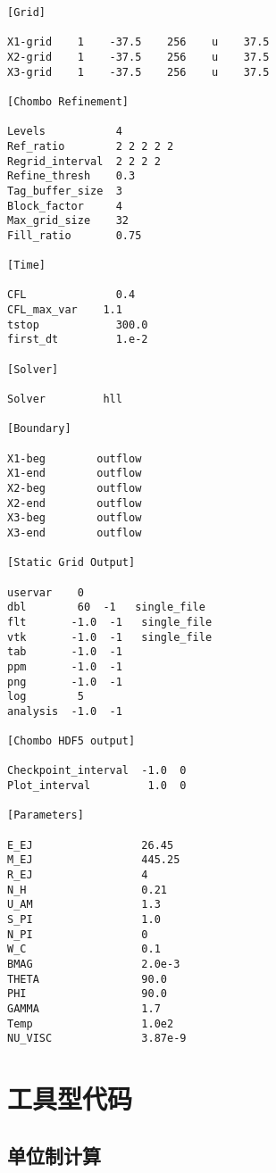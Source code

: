 \begin{lstlisting}
[Grid]

X1-grid    1    -37.5    256    u    37.5
X2-grid    1    -37.5    256    u    37.5
X3-grid    1    -37.5    256    u    37.5

[Chombo Refinement]

Levels           4
Ref_ratio        2 2 2 2 2
Regrid_interval  2 2 2 2
Refine_thresh    0.3
Tag_buffer_size  3
Block_factor     4
Max_grid_size    32
Fill_ratio       0.75

[Time]

CFL              0.4
CFL_max_var    1.1
tstop            300.0
first_dt         1.e-2

[Solver]

Solver         hll

[Boundary]

X1-beg        outflow
X1-end        outflow
X2-beg        outflow
X2-end        outflow
X3-beg        outflow
X3-end        outflow

[Static Grid Output]

uservar    0
dbl        60  -1   single_file
flt       -1.0  -1   single_file
vtk       -1.0  -1   single_file
tab       -1.0  -1
ppm       -1.0  -1
png       -1.0  -1
log        5
analysis  -1.0  -1

[Chombo HDF5 output]

Checkpoint_interval  -1.0  0
Plot_interval         1.0  0

[Parameters]

E_EJ                 26.45
M_EJ                 445.25
R_EJ                 4
N_H                  0.21
U_AM                 1.3
S_PI                 1.0
N_PI                 0
W_C                  0.1
BMAG                 2.0e-3
THETA                90.0
PHI                  90.0
GAMMA                1.7
Temp                 1.0e2
NU_VISC              3.87e-9

\end{lstlisting}


\chapter{工具型代码}
\label{Code}

\section{单位制计算}
\label{Codeu}


